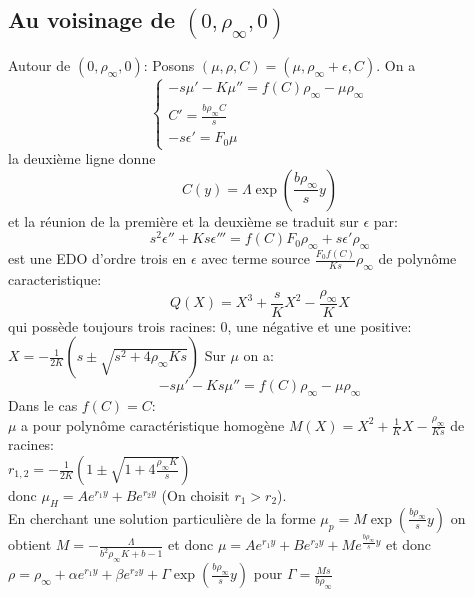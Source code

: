 \subsection{Au voisinage de $(0,\rho_\infty,0)$} 
Autour de $(0,\rho_\infty,0)$:
Posons $(\mu,\rho,C)=(\mu, \rho_\infty + \epsilon, C)$. On a \\
\begin{equation} \left\{ \begin{array}{ll} -s \mu'-K\mu''=f(C)\rho_\infty-\mu\rho_\infty\\C'=\frac{b\rho_\infty C}{s} \\
-s\epsilon'= F_0\mu \end{array}\right.
\end{equation}
la deuxième ligne donne \begin{equation}
C(y) = \Lambda\exp(\frac{b\rho_\infty}{s}y )
\end{equation}
et la réunion de la première et la deuxième se traduit sur $\epsilon$ par:
\begin{equation}
	s^2 \epsilon''+Ks\epsilon'''=f(C)F_0\rho_\infty+s\epsilon'\rho_\infty
\end{equation} est une EDO d'ordre trois en $\epsilon$ avec terme source $\frac{F_0f(C)}{Ks} \rho_\infty$ de polynôme caracteristique: \begin{equation}
	Q(X)=X^3+\frac{s}{K}X^2-\frac{\rho_\infty}{K}X
\end{equation}
qui possède toujours trois racines:  $0$, une négative et une positive: $X= - \frac{1}{2K}(s \pm \sqrt{s^2+4\rho_\infty Ks})$
Sur $\mu$ on a: \begin{equation}
	-s \mu'-Ks\mu''=f(C)\rho_\infty-\mu\rho_\infty
\end{equation}
Dans le cas $f(C)=C$:\\
$\mu$ a pour polynôme caractéristique homogène $M(X)=X^2 +\frac{1}{K}X - \frac{\rho_\infty}{Ks}$ de racines:\\$r_{1,2}= - \frac{1}{2K}(1 \pm \sqrt{1+4 \frac{\rho_\infty K}{s}})$ \\ donc $\mu_H = Ae^{r_1y}+ Be^{r_2y}$ (On choisit $r_1>r_2$).\\
En cherchant une solution particulière de la forme $\mu_p =M\exp(\frac{b\rho_\infty}{s}y )$ on obtient $M = - \frac{\Lambda}{b^2\rho_\infty K + b - 1}$ et donc $\mu=Ae^{r_1y}+ Be^{r_2y}+M e^{\frac{b\rho_\infty}{s}y }$
et donc $\rho = \rho_\infty + \alpha e^{r_1y} + \beta e^{r_2y} + \Gamma \exp(\frac{b\rho_\infty}{s}y)$ pour $\Gamma = \frac{Ms}{b\rho_\infty} $